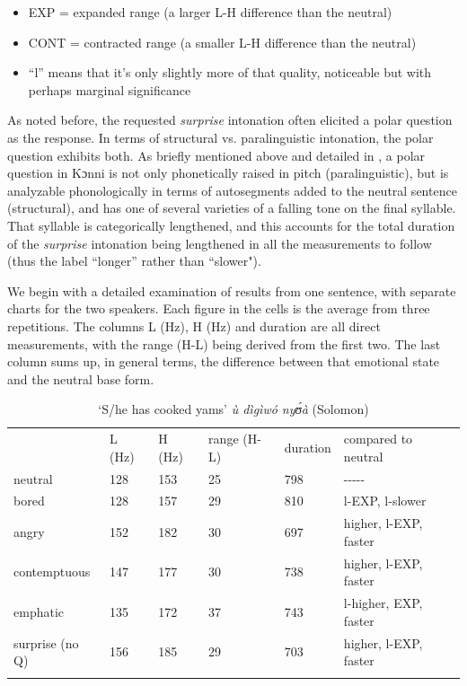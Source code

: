 \documentclass[output=paper]{langsci/langscibook}
\begin{document}
\begin{itemize}
\item EXP = expanded range (a larger L-H difference than the neutral)
\item CONT = contracted range (a smaller L-H difference than the neutral)
\item ``l'' means that it's only slightly more of that quality, noticeable but with perhaps marginal significance 
\end{itemize}

As noted before, the requested \emph{surprise} intonation often elicited a polar question as the response. In terms of structural vs. paralinguistic intonation, the polar question exhibits both. As briefly mentioned above and detailed in \citet{cahill2012}, a polar question in Kɔnni is not only phonetically raised in pitch (paralinguistic), but is analyzable phonologically in terms of autosegments added to the neutral sentence (structural), and has one of several varieties of a falling tone on the final syllable. That syllable is categorically lengthened, and this accounts for the total duration of the \emph{surprise} intonation being lengthened in all the measurements to follow (thus the label ``longer'' rather than ``slower").



We begin with a detailed examination of results from one sentence, with separate charts for the two speakers. Each figure in the cells is the average from three repetitions. The columns L (Hz), H (Hz) and duration are all direct measurements, with the range (H-L) being derived from the first two. The last column sums up, in general terms, the difference between that emotional state and the neutral base form. 




\begin{table}
\begin{tabular}{llllll} & L (Hz) & H (Hz) & range (H-L) & duration & compared to neutral\\
\lsptoprule
neutral & 128 & 153 & 25 & 798 & {}-{}-{}-{}-{}-\\
bored & 128 & 157 & 29 & 810 & l-EXP, l-slower\\
angry & 152 & 182 & 30 & 697 & higher, l-EXP, faster\\
contemptuous & 147 & 177 & 30 & 738 & higher, l-EXP, faster\\
emphatic & 135 & 172 & 37 & 743 & l-higher, EXP, faster\\
surprise (no Q) & 156 & 185 & 29 & 703 & higher, l-EXP, faster\\
\lspbottomrule
\end{tabular}

\caption{`S/he has cooked yams' \emph{ù dìgìwó nyʊ́à} (Solomon)}
\label{tab:3.cahill}

\end{table}
\end{document}
